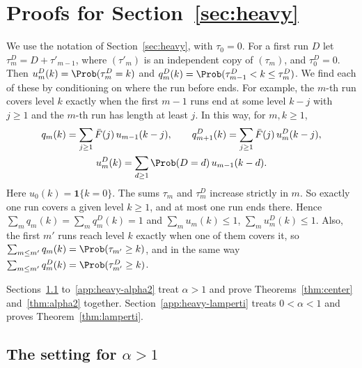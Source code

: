\section{Proofs for Section~\texorpdfstring{\ref{sec:heavy}}{4}}\label{app:heavy}

We use the notation of Section~\ref{sec:heavy}, with $\tau_0=0$. For a first run $D$ let
$\tau^D_m=D+\tau'_{m-1}$, where $(\tau'_m)$ is an independent copy of $(\tau_m)$, and
$\tau^D_0=0$. Then $u^D_m(k)=\Prob(\tau^D_m=k)$ and
$q^D_m(k)=\Prob(\tau^D_{m-1}<k\le\tau^D_m)$. We find each of these by conditioning on
where the run before ends. For example, the $m$-th run covers level $k$ exactly when the
first $m-1$ runs end at some level $k-j$ with $j\ge1$ and the $m$-th run has length at
least $j$. In this way, for $m,k\ge1$,
\begin{equation}\label{eq:C-conv}
\begin{gathered}
q_m(k)=\sum_{j\ge1}\bar F(j)\,u_{m-1}(k-j),\qquad
q^D_{m+1}(k)=\sum_{j\ge1}\bar F(j)\,u^D_m(k-j),\\
u^D_m(k)=\sum_{d\ge1}\Prob(D=d)\,u_{m-1}(k-d).
\end{gathered}
\end{equation}
Here $u_0(k)=\mathbf 1\{k=0\}$. The sums $\tau_m$ and $\tau^D_m$ increase strictly in $m$.
So exactly one run covers a given level $k\ge1$, and at most one run ends there. Hence
$\sum_mq_m(k)=\sum_mq^D_m(k)=1$ and $\sum_mu_m(k)\le1$, $\sum_mu^D_m(k)\le1$. Also, the
first $m'$ runs reach level $k$ exactly when one of them covers it, so
$\sum_{m\le m'}q_m(k)=\Prob(\tau_{m'}\ge k)$, and in the same way
$\sum_{m\le m'}q^D_m(k)=\Prob(\tau^D_{m'}\ge k)$.

Sections~\ref{app:heavy-setting} to~\ref{app:heavy-alpha2} treat $\alpha>1$ and prove
Theorems~\ref{thm:center} and~\ref{thm:alpha2} together.
Section~\ref{app:heavy-lamperti} treats $0<\alpha<1$ and proves
Theorem~\ref{thm:lamperti}.

\subsection{The setting for \texorpdfstring{$\alpha>1$}{alpha > 1}}\label{app:heavy-setting}

